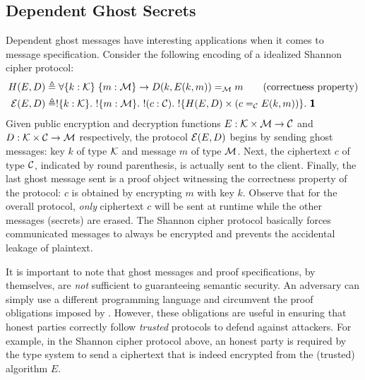 \subsection{Dependent Ghost Secrets}
Dependent ghost messages have interesting applications when it comes to message specification.
Consider the following encoding of a idealized Shannon cipher protocol:
\begin{align*}
  H(E, D) &\triangleq \forall \{k : \mathcal{K}\}\;\{m : \mathcal{M}\} \rightarrow D(k, E(k, m)) =_{\mathcal{M}} m
\qquad\text{(correctness property)}
  \\
  \mathcal{E}(E, D) &\triangleq
               !\{k : \mathcal{K}\}.\ !\{m : \mathcal{M}\}.\ !(c : \mathcal{C}).\ !\{H(E,D) \times (c =_{\mathcal{C}} E(k, m))\}.\ \textbf{\textsf{1}}
\end{align*}
Given public encryption and decryption functions
$E: \mathcal{K} \times \mathcal{M} \rightarrow \mathcal{C}$ and
$D: \mathcal{K} \times \mathcal{C} \rightarrow \mathcal{M}$ respectively, the protocol $\mathcal{E}(E,D)$
begins by sending ghost messages: key $k$ of type $\mathcal{K}$ and message $m$ of type
$\mathcal{M}$.  Next, the ciphertext $c$ of type $\mathcal{C}$, indicated by round
parenthesis, is actually sent to the client. Finally, the last ghost message
sent is a proof object witnessing the correctness property of the
protocol: $c$ is obtained by encrypting $m$ with key $k$.  Observe that for the
overall protocol, \emph{only} ciphertext $c$ will be sent at runtime while the
other messages (secrets) are erased. The Shannon cipher protocol basically
forces communicated messages to always be encrypted and prevents the accidental
leakage of plaintext.

It is important to note that ghost messages and proof specifications, by
themselves, are \emph{not} sufficient to guaranteeing semantic security.
An adversary can simply use a different programming language and circumvent the
proof obligations imposed by \TLLC{}. However, these obligations are useful in
ensuring that honest parties correctly follow \emph{trusted} protocols to defend
against attackers. For example, in the Shannon cipher protocol above, an honest
party is required by the type system to send a ciphertext that is indeed encrypted
from the (trusted) algorithm $E$.

